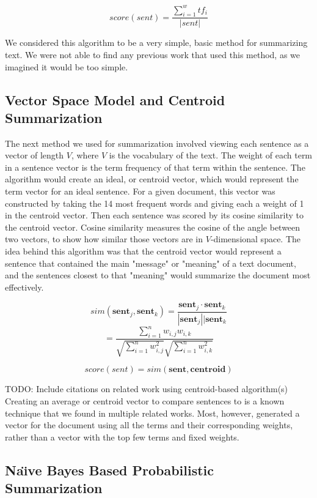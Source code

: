 \documentclass[11pt,a4paper]{article}
\begin{document}
$$score(sent) = \frac{\sum_{i = 1}^{w} tf_i}{|sent|}$$

We considered this algorithm to be a very simple, basic method for summarizing text. We were not able to find any previous work that used this method, as we imagined it would be too simple.

\subsection{Vector Space Model and Centroid Summarization}

The next method we used for summarization involved viewing each sentence as a vector of length $V$, where $V$ is the vocabulary of the text. The weight of each term in a sentence vector is the term frequency of that term within the sentence. The algorithm would create an ideal, or centroid vector, which would represent the term vector for an ideal sentence. For a given document, this vector was constructed by taking the 14 most frequent words and giving each a weight of 1 in the centroid vector. Then each sentence was scored by its cosine similarity to the centroid vector. Cosine similarity measures the cosine of the angle between two vectors, to show how similar those vectors are in $V$-dimensional space. The idea behind this algorithm was that the centroid vector would represent a sentence that contained the main "message" or "meaning" of a text document, and the sentences closest to that "meaning" would summarize the document most effectively.

$$sim(\textbf{sent}_j, \textbf{sent}_k) = \frac{\textbf{sent}_j \cdot \textbf{sent}_k}{|\textbf{sent}_j||\textbf{sent}_k}$$
$$= \frac{\sum_{i=1}^{n}w_{i,j}w_{i,k}}{\sqrt{\sum_{i=1}^{n}w_{i,j}^2}\sqrt{\sum_{i=1}^{n}w_{i,k}^2}}$$

$$score(sent) = sim(\textbf{sent}, \textbf{centroid})$$

TODO: Include citations on related work using centroid-based algorithm(s)
Creating an average or centroid vector to compare sentences to is a known technique that we found in multiple related works. Most, however, generated a vector for the document using all the terms and their corresponding weights, rather than a vector with the top few terms and fixed weights.

\subsection{Na{\"\i}ve Bayes Based Probabilistic Summarization}
\end{document}
